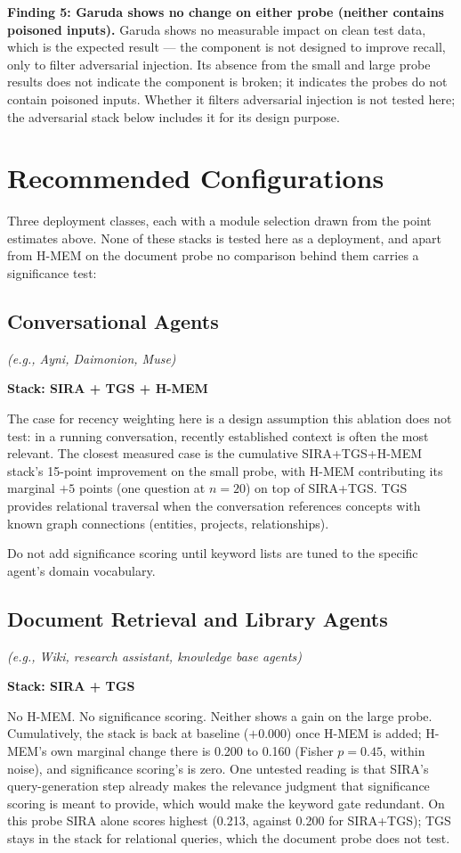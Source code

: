 \documentclass[11pt,a4paper]{article}
\begin{document}
\textbf{Finding 5: Garuda shows no change on either probe (neither contains poisoned inputs).}
Garuda shows no measurable impact on clean test data, which is the expected result --- the component is not designed to improve recall, only to filter adversarial injection. Its absence from the small and large probe results does not indicate the component is broken; it indicates the probes do not contain poisoned inputs. Whether it filters adversarial injection is not tested here; the adversarial stack below includes it for its design purpose.

\section{Recommended Configurations}

Three deployment classes, each with a module selection drawn from the point estimates above. None of these stacks is tested here as a deployment, and apart from H-MEM on the document probe no comparison behind them carries a significance test:

\subsection{Conversational Agents}
\textit{(e.g., Ayni, Daimonion, Muse)}

\textbf{Stack: SIRA + TGS + H-MEM}

The case for recency weighting here is a design assumption this ablation does not test: in a running conversation, recently established context is often the most relevant. The closest measured case is the cumulative SIRA+TGS+H-MEM stack's 15-point improvement on the small probe, with H-MEM contributing its marginal $+5$ points (one question at $n=20$) on top of SIRA+TGS. TGS provides relational traversal when the conversation references concepts with known graph connections (entities, projects, relationships).

Do not add significance scoring until keyword lists are tuned to the specific agent's domain vocabulary.

\subsection{Document Retrieval and Library Agents}
\textit{(e.g., Wiki, research assistant, knowledge base agents)}

\textbf{Stack: SIRA + TGS}

No H-MEM. No significance scoring. Neither shows a gain on the large probe. Cumulatively, the stack is back at baseline ($+0.000$) once H-MEM is added; H-MEM's own marginal change there is 0.200 to 0.160 (Fisher $p=0.45$, within noise), and significance scoring's is zero. One untested reading is that SIRA's query-generation step already makes the relevance judgment that significance scoring is meant to provide, which would make the keyword gate redundant. On this probe SIRA alone scores highest (0.213, against 0.200 for SIRA+TGS); TGS stays in the stack for relational queries, which the document probe does not test.
\end{document}
